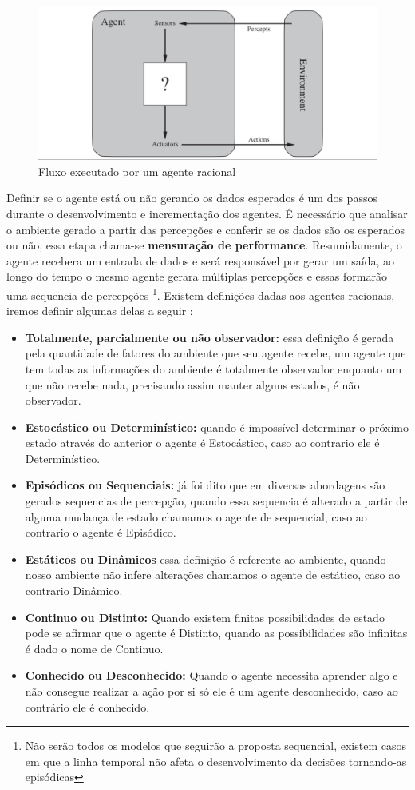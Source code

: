 \begin{figure}
    \centering
    \includegraphics[width=.8\textwidth]{imagens/rational_agent_draw.png}
    \caption{Fluxo executado por um agente racional}
    \label{fig:rational_agent_draw}
\end{figure}

Definir se o agente está ou não gerando os dados esperados é um dos passos durante o desenvolvimento e incrementação dos agentes. É necessário que analisar o ambiente gerado a partir das percepções e conferir se os dados são os esperados ou não, essa etapa chama-se \textbf{mensuração de performance}. Resumidamente, o agente recebera um entrada de dados e será responsável por gerar um saída, ao longo do tempo o mesmo agente gerara múltiplas percepções e essas formarão uma sequencia de percepções \footnote{Não serão todos os modelos que seguirão a proposta sequencial, existem casos em que a linha temporal não afeta o desenvolvimento da decisões tornando-as episódicas}. Existem definições dadas aos agentes racionais, iremos definir algumas delas a seguir \cite[34-45]{russell2003artificial}:

\begin{itemize}
 \item \textbf{Totalmente, parcialmente ou não observador:} essa definição é gerada pela quantidade de fatores do ambiente que seu agente recebe, um agente que tem todas as informações do ambiente é totalmente observador enquanto um que não recebe nada, precisando assim manter alguns estados, é não observador.
 \item \textbf{Estocástico ou Determinístico:} quando é impossível determinar o próximo estado através do anterior o agente é Estocástico, caso ao contrario ele é Determinístico.
 \item \textbf{Episódicos ou Sequenciais:} já foi dito que em diversas abordagens são gerados sequencias de percepção, quando essa sequencia é alterado a partir de alguma mudança de estado chamamos o agente de sequencial, caso ao contrario o agente é Episódico.
 \item \textbf{Estáticos ou Dinâmicos} essa definição é referente ao ambiente, quando nosso ambiente não infere alterações chamamos o agente de estático, caso ao contrario Dinâmico.
 \item \textbf{Continuo ou Distinto:} Quando existem finitas possibilidades de estado pode se afirmar que o agente é Distinto, quando as possibilidades são infinitas é dado o nome de Continuo.
 \item \textbf{Conhecido ou Desconhecido:} Quando o agente necessita aprender algo e não consegue realizar a ação por si só ele é um agente desconhecido, caso ao contrário ele é conhecido.
\end{itemize}

